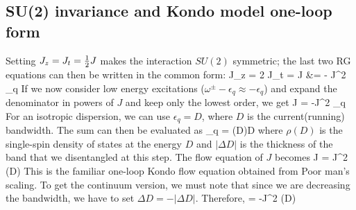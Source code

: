 \documentclass[14pt]{extarticle}
\numberwithin{equation}{section}
\begin{document}
\subsection{SU(2) invariance and Kondo model one-loop form}
Setting \(J_z = J_t = \frac{1}{2} J\) makes the interaction \(SU(2)\) symmetric; the last two RG equations can then be written in the common form:
\Delta J_z = 2 \Delta J_t = \Delta J &= - \hf J^2 \sum_q 
\eeq
If we now consider low energy excitations (\(\omega^\pm - \epsilon_q \approx  - \epsilon_q\)) and expand the denominator in powers of \(J\) and keep only the lowest order, we get
\beq
\Delta J = -\hf J^2 \sum_q 
\eeq
For an isotropic dispersion, we can use \(\epsilon_q = D\), where \(D\) is the current(running) bandwidth. The sum can then be evaluated as
\beq
\sum_q = \rho(D)\Delta D
\eeq
where \(\rho(D)\) is the single-spin density of states at the energy \(D\) and \(|\Delta D|\) is the thickness of the band that we disentangled at this step. The flow equation of \(J\) becomes
\beq
\Delta J = J^2 \rho(D)
\eeq
This is the familiar one-loop Kondo flow equation obtained from Poor man's scaling. To get the continuum version, we must note that since we are decreasing the bandwidth, we have to set \(\Delta D = -|\Delta D|\). Therefore,
\beq
{} = -J^2 \rho(D)
\eeq
\end{document}
